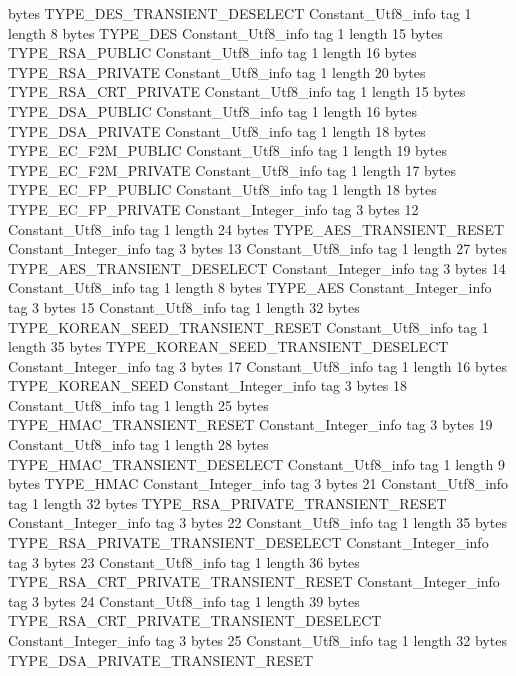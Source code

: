 {{{			bytes	TYPE_DES_TRANSIENT_DESELECT
		}
		Constant_Utf8_info {
			tag	1
			length	8
			bytes	TYPE_DES
		}
		Constant_Utf8_info {
			tag	1
			length	15
			bytes	TYPE_RSA_PUBLIC
		}
		Constant_Utf8_info {
			tag	1
			length	16
			bytes	TYPE_RSA_PRIVATE
		}
		Constant_Utf8_info {
			tag	1
			length	20
			bytes	TYPE_RSA_CRT_PRIVATE
		}
		Constant_Utf8_info {
			tag	1
			length	15
			bytes	TYPE_DSA_PUBLIC
		}
		Constant_Utf8_info {
			tag	1
			length	16
			bytes	TYPE_DSA_PRIVATE
		}
		Constant_Utf8_info {
			tag	1
			length	18
			bytes	TYPE_EC_F2M_PUBLIC
		}
		Constant_Utf8_info {
			tag	1
			length	19
			bytes	TYPE_EC_F2M_PRIVATE
		}
		Constant_Utf8_info {
			tag	1
			length	17
			bytes	TYPE_EC_FP_PUBLIC
		}
		Constant_Utf8_info {
			tag	1
			length	18
			bytes	TYPE_EC_FP_PRIVATE
		}
		Constant_Integer_info {
			tag	3
			bytes	12
		}
		Constant_Utf8_info {
			tag	1
			length	24
			bytes	TYPE_AES_TRANSIENT_RESET
		}
		Constant_Integer_info {
			tag	3
			bytes	13
		}
		Constant_Utf8_info {
			tag	1
			length	27
			bytes	TYPE_AES_TRANSIENT_DESELECT
		}
		Constant_Integer_info {
			tag	3
			bytes	14
		}
		Constant_Utf8_info {
			tag	1
			length	8
			bytes	TYPE_AES
		}
		Constant_Integer_info {
			tag	3
			bytes	15
		}
		Constant_Utf8_info {
			tag	1
			length	32
			bytes	TYPE_KOREAN_SEED_TRANSIENT_RESET
		}
		Constant_Utf8_info {
			tag	1
			length	35
			bytes	TYPE_KOREAN_SEED_TRANSIENT_DESELECT
		}
		Constant_Integer_info {
			tag	3
			bytes	17
		}
		Constant_Utf8_info {
			tag	1
			length	16
			bytes	TYPE_KOREAN_SEED
		}
		Constant_Integer_info {
			tag	3
			bytes	18
		}
		Constant_Utf8_info {
			tag	1
			length	25
			bytes	TYPE_HMAC_TRANSIENT_RESET
		}
		Constant_Integer_info {
			tag	3
			bytes	19
		}
		Constant_Utf8_info {
			tag	1
			length	28
			bytes	TYPE_HMAC_TRANSIENT_DESELECT
		}
		Constant_Utf8_info {
			tag	1
			length	9
			bytes	TYPE_HMAC
		}
		Constant_Integer_info {
			tag	3
			bytes	21
		}
		Constant_Utf8_info {
			tag	1
			length	32
			bytes	TYPE_RSA_PRIVATE_TRANSIENT_RESET
		}
		Constant_Integer_info {
			tag	3
			bytes	22
		}
		Constant_Utf8_info {
			tag	1
			length	35
			bytes	TYPE_RSA_PRIVATE_TRANSIENT_DESELECT
		}
		Constant_Integer_info {
			tag	3
			bytes	23
		}
		Constant_Utf8_info {
			tag	1
			length	36
			bytes	TYPE_RSA_CRT_PRIVATE_TRANSIENT_RESET
		}
		Constant_Integer_info {
			tag	3
			bytes	24
		}
		Constant_Utf8_info {
			tag	1
			length	39
			bytes	TYPE_RSA_CRT_PRIVATE_TRANSIENT_DESELECT
		}
		Constant_Integer_info {
			tag	3
			bytes	25
		}
		Constant_Utf8_info {
			tag	1
			length	32
			bytes	TYPE_DSA_PRIVATE_TRANSIENT_RESET
}}}
